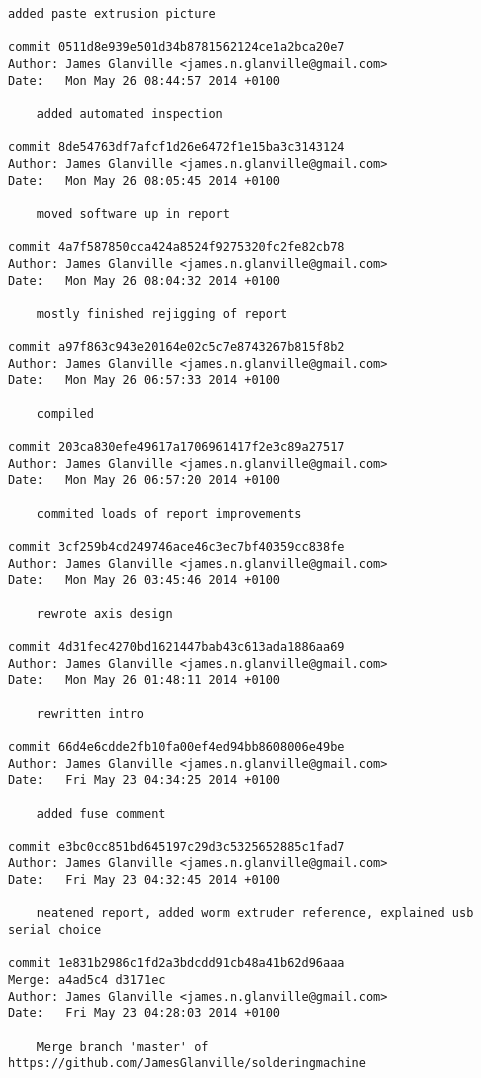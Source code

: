 \documentclass[a4paper,11pt]{article}  %
\begin{document}
\begin{lstlisting}[frame=single]
    added paste extrusion picture

commit 0511d8e939e501d34b8781562124ce1a2bca20e7
Author: James Glanville <james.n.glanville@gmail.com>
Date:   Mon May 26 08:44:57 2014 +0100

    added automated inspection

commit 8de54763df7afcf1d26e6472f1e15ba3c3143124
Author: James Glanville <james.n.glanville@gmail.com>
Date:   Mon May 26 08:05:45 2014 +0100

    moved software up in report

commit 4a7f587850cca424a8524f9275320fc2fe82cb78
Author: James Glanville <james.n.glanville@gmail.com>
Date:   Mon May 26 08:04:32 2014 +0100

    mostly finished rejigging of report

commit a97f863c943e20164e02c5c7e8743267b815f8b2
Author: James Glanville <james.n.glanville@gmail.com>
Date:   Mon May 26 06:57:33 2014 +0100

    compiled

commit 203ca830efe49617a1706961417f2e3c89a27517
Author: James Glanville <james.n.glanville@gmail.com>
Date:   Mon May 26 06:57:20 2014 +0100

    commited loads of report improvements

commit 3cf259b4cd249746ace46c3ec7bf40359cc838fe
Author: James Glanville <james.n.glanville@gmail.com>
Date:   Mon May 26 03:45:46 2014 +0100

    rewrote axis design

commit 4d31fec4270bd1621447bab43c613ada1886aa69
Author: James Glanville <james.n.glanville@gmail.com>
Date:   Mon May 26 01:48:11 2014 +0100

    rewritten intro

commit 66d4e6cdde2fb10fa00ef4ed94bb8608006e49be
Author: James Glanville <james.n.glanville@gmail.com>
Date:   Fri May 23 04:34:25 2014 +0100

    added fuse comment

commit e3bc0cc851bd645197c29d3c5325652885c1fad7
Author: James Glanville <james.n.glanville@gmail.com>
Date:   Fri May 23 04:32:45 2014 +0100

    neatened report, added worm extruder reference, explained usb serial choice

commit 1e831b2986c1fd2a3bdcdd91cb48a41b62d96aaa
Merge: a4ad5c4 d3171ec
Author: James Glanville <james.n.glanville@gmail.com>
Date:   Fri May 23 04:28:03 2014 +0100

    Merge branch 'master' of https://github.com/JamesGlanville/solderingmachine


\end{lstlisting}
\end{document}

